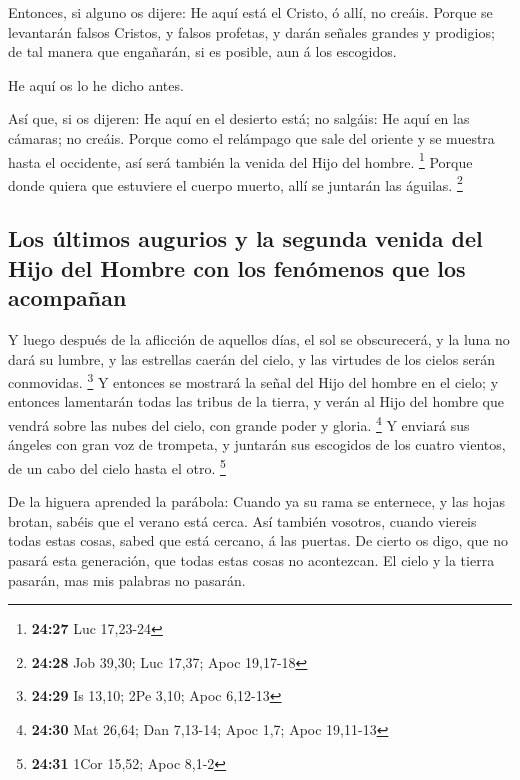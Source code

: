  Entonces, si alguno os dijere: He aquí está el Cristo, ó
allí, no creáis.  Porque se levantarán falsos Cristos, y
falsos profetas, y darán señales grandes y prodigios; de tal manera que
engañarán, si es posible, aun á los escogidos.

 He aquí os lo he dicho antes.

 Así que, si os dijeren: He aquí en el desierto está; no
salgáis: He aquí en las cámaras; no creáis.  Porque como el
relámpago que sale del oriente y se muestra hasta el occidente, así será
también la venida del Hijo del hombre. \footnote{\textbf{24:27} Luc
  17,23-24}  Porque donde quiera que estuviere el cuerpo
muerto, allí se juntarán las águilas. \footnote{\textbf{24:28} Job
  39,30; Luc 17,37; Apoc 19,17-18}

\hypertarget{los-uxfaltimos-augurios-y-la-segunda-venida-del-hijo-del-hombre-con-los-fenuxf3menos-que-los-acompauxf1an}{%
\subsection{Los últimos augurios y la segunda venida del Hijo del Hombre
con los fenómenos que los
acompañan}\label{los-uxfaltimos-augurios-y-la-segunda-venida-del-hijo-del-hombre-con-los-fenuxf3menos-que-los-acompauxf1an}}

 Y luego después de la aflicción de aquellos días, el sol
se obscurecerá, y la luna no dará su lumbre, y las estrellas caerán del
cielo, y las virtudes de los cielos serán conmovidas. \footnote{\textbf{24:29}
  Is 13,10; 2Pe 3,10; Apoc 6,12-13}  Y entonces se mostrará
la señal del Hijo del hombre en el cielo; y entonces lamentarán todas
las tribus de la tierra, y verán al Hijo del hombre que vendrá sobre las
nubes del cielo, con grande poder y gloria. \footnote{\textbf{24:30} Mat
  26,64; Dan 7,13-14; Apoc 1,7; Apoc 19,11-13}  Y enviará
sus ángeles con gran voz de trompeta, y juntarán sus escogidos de los
cuatro vientos, de un cabo del cielo hasta el otro. \footnote{\textbf{24:31}
  1Cor 15,52; Apoc 8,1-2}

 De la higuera aprended la parábola: Cuando ya su rama se
enternece, y las hojas brotan, sabéis que el verano está cerca.
 Así también vosotros, cuando viereis todas estas cosas,
sabed que está cercano, á las puertas.  De cierto os digo,
que no pasará esta generación, que todas estas cosas no acontezcan.
 El cielo y la tierra pasarán, mas mis palabras no pasarán.

